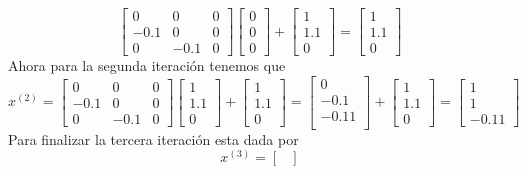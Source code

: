 \begin{enumerate}
\begin{solution}
$$\begin{bmatrix}
           0&0&0\\
           -0.1&0&0\\
           0&-0.1&0
       \end{bmatrix}\begin{bmatrix}
           0\\
           0\\
           0
       \end{bmatrix}+\begin{bmatrix}
            1\\
            1.1\\
            0
        \end{bmatrix}=\begin{bmatrix}
            1\\
            1.1\\
            0
        \end{bmatrix}$$
        Ahora para la segunda iteración tenemos que
        $$x^{(2)}=\begin{bmatrix}
           0&0&0\\
           -0.1&0&0\\
           0&-0.1&0
       \end{bmatrix}\begin{bmatrix}
            1\\
            1.1\\
            0
        \end{bmatrix}+\begin{bmatrix}
            1\\
            1.1\\
            0
        \end{bmatrix}=\begin{bmatrix}
           0\\
           -0.1\\
           -0.11\\
        \end{bmatrix}+\begin{bmatrix}
            1\\
            1.1\\
            0
        \end{bmatrix}=\begin{bmatrix}
            1\\
            1\\
            -0.11
        \end{bmatrix}$$
        Para finalizar la tercera iteración esta dada por
        $$x^{(3)}=\begin{bmatrix}

\end{bmatrix}$$
\end{solution}
\end{enumerate}
